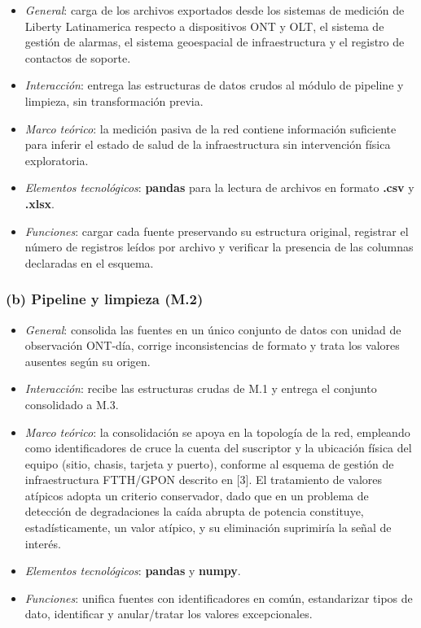 \documentclass[12pt,a4paper]{article}
\begin{document}
\begin{itemize}
    \item \textit{General}: carga de los archivos exportados desde los sistemas de medición de Liberty Latinamerica respecto a dispositivos ONT y OLT, el sistema de gestión de alarmas, el sistema geoespacial de infraestructura y el registro de contactos de soporte.
    \item \textit{Interacción}: entrega las estructuras de datos crudos al módulo de pipeline y limpieza, sin transformación previa.
    \item \textit{Marco teórico}: la medición pasiva de la red contiene información suficiente para inferir el estado de salud de la infraestructura sin intervención física exploratoria.
    \item \textit{Elementos tecnológicos}: \textbf{pandas} para la lectura de archivos en formato \textbf{.csv} y \textbf{.xlsx}.
    \item \textit{Funciones}: cargar cada fuente preservando su estructura original, registrar el número de registros leídos por archivo y verificar la presencia de las columnas declaradas en el esquema.
\end{itemize}


\subsubsection*{(b) Pipeline y limpieza (M.2)}
 
\begin{itemize}
    \item \textit{General}: consolida las fuentes en un único conjunto de datos con unidad de observación ONT-día, corrige inconsistencias de formato y trata los valores ausentes según su origen.
    \item \textit{Interacción}: recibe las estructuras crudas de M.1 y entrega el conjunto consolidado a M.3.
    \item \textit{Marco teórico}: la consolidación se apoya en la topología de la red, empleando como identificadores de cruce la cuenta del suscriptor y la ubicación física del equipo (sitio, chasis, tarjeta y puerto), conforme al esquema de gestión de infraestructura FTTH/GPON descrito en [3]. El tratamiento de valores atípicos adopta un criterio conservador, dado que en un problema de detección de degradaciones la caída abrupta de potencia constituye, estadísticamente, un valor atípico, y su eliminación suprimiría la señal de interés.
    \item \textit{Elementos tecnológicos}: \textbf{pandas} y \textbf{numpy}.
    \item \textit{Funciones}: unifica fuentes con identificadores en común, estandarizar tipos de dato, identificar y anular/tratar los valores excepcionales.
\end{itemize}
\end{document}
